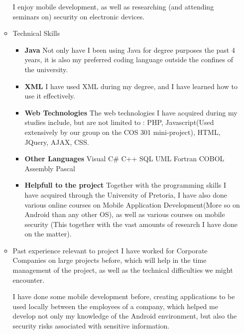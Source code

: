 \documentclass[12pt, oneside]{article}
\begin{document}
\begin{enumerate}
\begin{itemize}
				I enjoy mobile development, as well as researching (and attending seminars on) security on electronic devices.
			\item Technical Skills\newline
				\begin{itemize}
				\item {\bf Java}\newline
					Not only have I been using Java for degree purposes the past 4 years, it is also my preferred coding language
					outside the confines of the university.
				\item {\bf XML}\newline
					I have used XML during my degree, and I have learned how to use it effectively.
				\item {\bf Web Technologies}\newline
					The web technologies I have acquired during my studies include, but are not limited to :
					PHP, Javascript(Used extensively by our group on the COS 301 mini-project), HTML, JQuery, AJAX, CSS.
				\item {\bf Other Languages}\newline
					Visual C\#\newline
					C++\newline
					SQL\newline
					UML\newline	
					Fortran\newline
					COBOL\newline
					Assembly\newline
					Pascal\newline
				\item {\bf Helpfull to the project}\newline
					Together with the programming skills I have acquired through the University of Pretoria, I have also done various online
					courses on Mobile Application Development(More so on Android than any other OS), as well as various courses on mobile security
					(This together with the vast amounts of research I have done on the matter).
				\end{itemize}
			\item Past experience relevant to project\newline
				I have worked for Corporate Companies on large projects before, which will help in the time management of the project,
				as well as the technical difficulties we might encounter.
				
				I have done some mobile development before, creating applications to be used locally between the employees of a company, which helped me 
				develop not only my knowledge of the Android environment, but also the security risks associated with sensitive information.
				

\end{itemize}
\end{enumerate}
\end{document}
